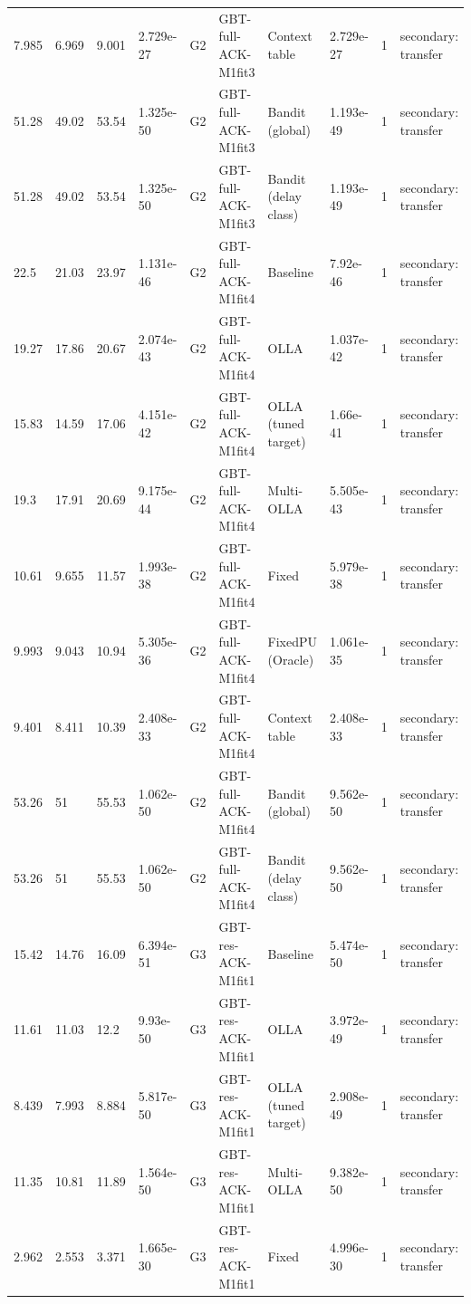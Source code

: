 \documentclass[10pt]{article}
\begin{document}
\begin{landscape}
\begin{longtable}{@{}llllllllll@{}}
7.985 & 6.969 & 9.001 & 2.729e-27 & G2 & GBT-full-ACK-M1fit3 & Context table & 2.729e-27 & 1 & secondary: transfer \\
51.28 & 49.02 & 53.54 & 1.325e-50 & G2 & GBT-full-ACK-M1fit3 & Bandit (global) & 1.193e-49 & 1 & secondary: transfer \\
51.28 & 49.02 & 53.54 & 1.325e-50 & G2 & GBT-full-ACK-M1fit3 & Bandit (delay class) & 1.193e-49 & 1 & secondary: transfer \\
22.5 & 21.03 & 23.97 & 1.131e-46 & G2 & GBT-full-ACK-M1fit4 & Baseline & 7.92e-46 & 1 & secondary: transfer \\
19.27 & 17.86 & 20.67 & 2.074e-43 & G2 & GBT-full-ACK-M1fit4 & OLLA & 1.037e-42 & 1 & secondary: transfer \\
15.83 & 14.59 & 17.06 & 4.151e-42 & G2 & GBT-full-ACK-M1fit4 & OLLA (tuned target) & 1.66e-41 & 1 & secondary: transfer \\
19.3 & 17.91 & 20.69 & 9.175e-44 & G2 & GBT-full-ACK-M1fit4 & Multi-OLLA & 5.505e-43 & 1 & secondary: transfer \\
10.61 & 9.655 & 11.57 & 1.993e-38 & G2 & GBT-full-ACK-M1fit4 & Fixed & 5.979e-38 & 1 & secondary: transfer \\
9.993 & 9.043 & 10.94 & 5.305e-36 & G2 & GBT-full-ACK-M1fit4 & FixedPU (Oracle) & 1.061e-35 & 1 & secondary: transfer \\
9.401 & 8.411 & 10.39 & 2.408e-33 & G2 & GBT-full-ACK-M1fit4 & Context table & 2.408e-33 & 1 & secondary: transfer \\
53.26 & 51 & 55.53 & 1.062e-50 & G2 & GBT-full-ACK-M1fit4 & Bandit (global) & 9.562e-50 & 1 & secondary: transfer \\
53.26 & 51 & 55.53 & 1.062e-50 & G2 & GBT-full-ACK-M1fit4 & Bandit (delay class) & 9.562e-50 & 1 & secondary: transfer \\
15.42 & 14.76 & 16.09 & 6.394e-51 & G3 & GBT-res-ACK-M1fit1 & Baseline & 5.474e-50 & 1 & secondary: transfer \\
11.61 & 11.03 & 12.2 & 9.93e-50 & G3 & GBT-res-ACK-M1fit1 & OLLA & 3.972e-49 & 1 & secondary: transfer \\
8.439 & 7.993 & 8.884 & 5.817e-50 & G3 & GBT-res-ACK-M1fit1 & OLLA (tuned target) & 2.908e-49 & 1 & secondary: transfer \\
11.35 & 10.81 & 11.89 & 1.564e-50 & G3 & GBT-res-ACK-M1fit1 & Multi-OLLA & 9.382e-50 & 1 & secondary: transfer \\
2.962 & 2.553 & 3.371 & 1.665e-30 & G3 & GBT-res-ACK-M1fit1 & Fixed & 4.996e-30 & 1 & secondary: transfer \\

\end{longtable}
\end{landscape}
\end{document}
